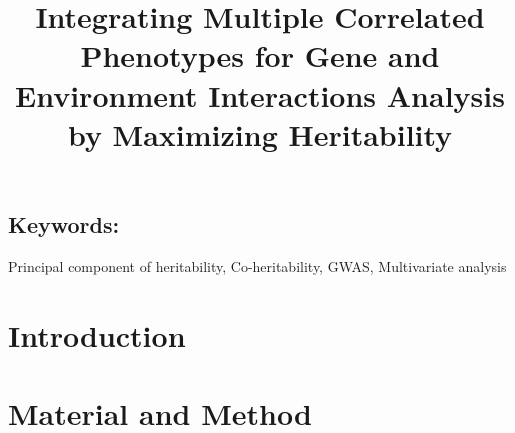 \documentclass[11pt]{article}
\title{Integrating Multiple Correlated Phenotypes for Gene and Environment Interactions Analysis by Maximizing Heritability}
\begin{document}
\baselineskip=20pt

\maketitle
\setcounter{page}{1}



\begin{abstract}
\end{abstract}

\vspace{1cm}
\subsection*{Keywords:}
Principal component of heritability, Co-heritability,  GWAS, Multivariate analysis

\clearpage
\section{Introduction}



\section{Material and Method}
\end{document}
